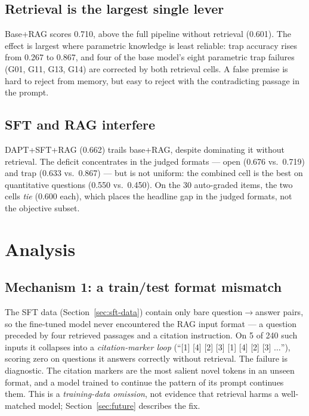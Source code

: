 \documentclass[11pt]{article}
\begin{document}
\subsection{Retrieval is the largest single lever}

Base+RAG scores 0.710, above the full pipeline without retrieval
(0.601). The effect is largest where parametric knowledge is
least reliable: trap accuracy rises from 0.267 to 0.867, and four of
the base model's eight parametric trap failures (G01, G11, G13, G14)
are corrected by both retrieval cells. A false premise is hard to
reject from memory, but easy to reject with the contradicting passage
in the prompt.

\subsection{SFT and RAG interfere}

DAPT+SFT+RAG (0.662) trails base+RAG, despite dominating it without
retrieval. The deficit concentrates in the judged formats --- open
(0.676 vs.\ 0.719) and trap (0.633 vs.\ 0.867) --- but is not uniform:
the combined cell is the best on quantitative questions (0.550 vs.\
0.450). On the 30 auto-graded items, the two cells \emph{tie} (0.600
each), which places the headline gap in the judged formats, not the
objective subset.

\section{Analysis}
\label{sec:analysis}

\subsection{Mechanism 1: a train/test format mismatch}

The SFT data (Section~\ref{sec:sft-data}) contain only bare
question$\rightarrow$answer pairs, so the fine-tuned model never
encountered the RAG input format --- a question preceded by four
retrieved passages and a citation instruction. On 5 of 240 such inputs
it collapses into a \emph{citation-marker loop} (``[1] [4] [2] [3] [1]
[4] [2] [3] $\ldots$''), scoring zero on questions it answers correctly
without retrieval. The failure is diagnostic. The citation markers are
the most salient novel tokens in an unseen format, and a model trained
to continue the pattern of its prompt continues them. This is a
\emph{training-data omission}, not evidence that retrieval harms a
well-matched model; Section~\ref{sec:future} describes the fix.
\end{document}
